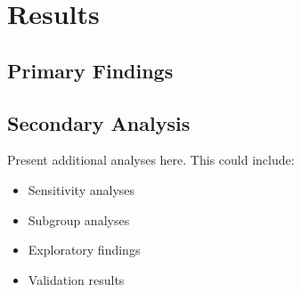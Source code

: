 
\section{Results}

\subsection{Primary Findings}




\subsection{Secondary Analysis}

Present additional analyses here. This could include:
\begin{itemize}
\item Sensitivity analyses
\item Subgroup analyses
\item Exploratory findings
\item Validation results
\end{itemize}

